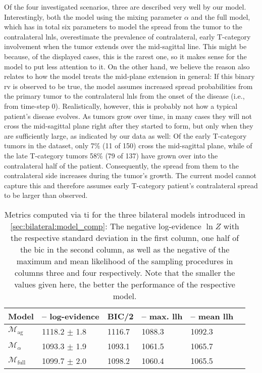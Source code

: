 \documentclass[\relativeRoot/main.tex]{subfiles}
\begin{document}
Of the four investigated scenarios, three are described very well by our model. Interestingly, both the model using the mixing parameter $\alpha$ and the full model, which has in total six parameters to model the spread from the tumor to the contralateral \glspl{lnl}, overestimate the prevalence of contralateral, early T-category involvement when the tumor extends over the mid-sagittal line. This might be because, of the displayed cases, this is the rarest one, so it makes sense for the model to put less attention to it. On the other hand, we believe the reason also relates to how the model treats the mid-plane extension in general: If this binary \gls{rv} is observed to be true, the model assumes increased spread probabilities from the primary tumor to the contralateral \glspl{lnl} from the onset of the disease (i.e., from time-step 0). Realistically, however, this is probably not how a typical patient's disease evolves. As tumors grow over time, in many cases they will not cross the mid-sagittal plane right after they started to form, but only when they are sufficiently large, as indicated by our data as well: Of the early T-category tumors in the dataset, only 7\% (11 of 150) cross the mid-sagittal plane, while of the late T-category tumors 58\% (79 of 137) have grown over into the contralateral half of the patient. Consequently, the spread from them to the contralateral side increases during the tumor's growth. The current model cannot capture this and therefore assumes early T-category patient's contralateral spread to be larger than observed.

\begin{table}
    \centering
    \begin{tabular}{|l|l|l|l|l|l|}
        \hline
        \textbf{Model} & \textbf{-- log-evidence} & \textbf{BIC/2} & \textbf{-- max. llh} & \textbf{-- mean llh} \\
        \hline
        $\mathcal{M}_\text{ag}$ & 1118.2 $\pm$ 1.8 & 1116.7 & 1088.3 & 1092.3 \\
        $\mathcal{M}_\alpha$ & 1093.3 $\pm$ 1.9 & 1093.1 & 1061.5 & 1065.7 \\
        $\mathcal{M}_\text{full}$ & 1099.7 $\pm$ 2.0 & 1098.2 & 1060.4 & 1065.5 \\
        \hline
    \end{tabular}
    \caption[
        Metrics for assessing three bilateral models
    ]{
        Metrics computed via \gls{ti} for the three bilateral models introduced in \cref{sec:bilateral:model_comp}: The negative log-evidence $\ln{Z}$ with the respective standard deviation in the first column, one half of the \gls{bic} in the second column, as well as the negative of the maximum and mean likelihood of the sampling procedures in columns three and four respectively. Note that the smaller the values given here, the better the performance of the respective model.
    }
    \label{table:bilateral:model_comp:evidences}
\end{table}
\end{document}
